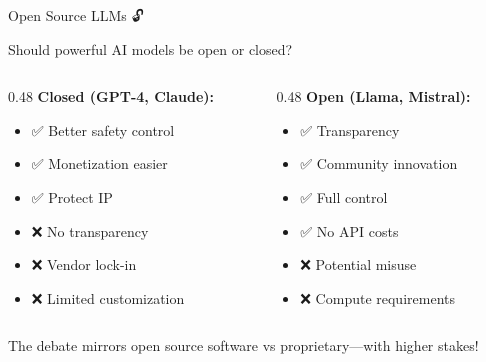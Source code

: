 \documentclass[aspectratio=169]{beamer}
\begin{document}
\begin{frame}[shrink=10]{Open Source LLMs 🔓}
\small
    \begin{discussion}
        Should powerful AI models be open or closed?
    \end{discussion}

    \vspace{0.3cm}

    \begin{columns}[T]
        \begin{column}{0.48\textwidth}
            \textbf{Closed (GPT-4, Claude):}
            \begin{itemize}\setlength{\itemsep}{0pt}
                \item ✅ Better safety control
                \item ✅ Monetization easier
                \item ✅ Protect IP
                \item ❌ No transparency
                \item ❌ Vendor lock-in
                \item ❌ Limited customization
            \end{itemize}
        \end{column}

        \begin{column}{0.48\textwidth}
            \textbf{Open (Llama, Mistral):}
            \begin{itemize}\setlength{\itemsep}{0pt}
                \item ✅ Transparency
                \item ✅ Community innovation
                \item ✅ Full control
                \item ✅ No API costs
                \item ❌ Potential misuse
                \item ❌ Compute requirements
            \end{itemize}
        \end{column}
    \end{columns}

    \vspace{0.3cm}

    \begin{thinkaboutit}
        The debate mirrors open source software vs proprietary—with higher stakes!
    \end{thinkaboutit}
\end{frame}
\end{document}
